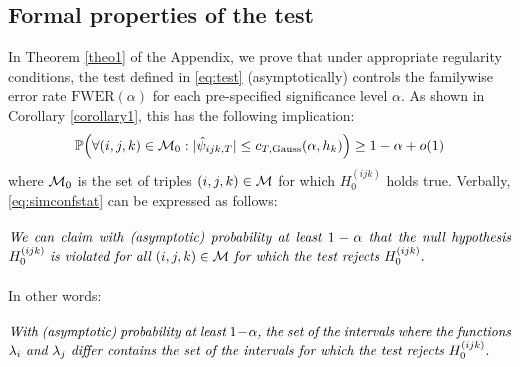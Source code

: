 \documentclass[a4paper,12pt]{article}
\numberwithin{equation}{section}
\begin{document}
\subsection{Formal properties of the test}\label{subsec:test:properties}


In Theorem \ref{theo1} of the Appendix, we prove that under appropriate regularity conditions, the test defined in \eqref{eq:test} (asymptotically) controls the familywise error rate $\text{FWER}(\alpha)$ for each pre-specified significance level $\alpha$. As shown in Corollary \ref{corollary1}, this has the following implication: 
\begin{align}\label{eq:simconfstat}
\mathbb{P}\Big( \forall (i,j,k) \in \mathcal{M}_0: |\hat{\psi}_{ijk,T}| \le c_{T,\textnormal{Gauss}}(\alpha,h_k) \Big) \ge 1 - \alpha + o(1)
\end{align}
where $\mathcal{M}_0$ is the set of triples $(i,j,k) \in \mathcal{M}$ for which $H_0^{(ijk)}$ holds true. Verbally, \eqref{eq:simconfstat} can be expressed as follows:  
\begin{equation}\label{eq:confidencestatement1}
\begin{minipage}[c][1.5cm][c]{13cm}
\textit{We can claim with (asymptotic) probability at least $1-\alpha$ that the null hypothesis $H_0^{(ijk)}$ is violated for all $(i,j,k) \in \indexset$ for which the test rejects $H_0^{(ijk)}$.} 
\end{minipage}
\end{equation}
In other words:
\begin{equation}\label{eq:confidencestatement2}
\begin{minipage}[c][1.5cm][c]{13cm}
\textit{With (asymptotic) probability at least $1-\alpha$, the set of the intervals where the functions $\lambda_i$ and $\lambda_j$ differ contains the set of the intervals for which the test rejects $H_0^{(ijk)}$.} 
\end{minipage}
\end{equation}
\end{document}
